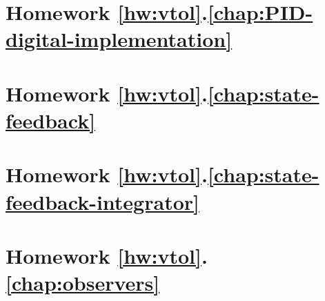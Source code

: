 	\section*{
		Homework \ref{hw:vtol}.\ref{chap:PID-digital-implementation}}  
		\label{hw:vtol_digital_PID}
		
	\section*{
		Homework \ref{hw:vtol}.\ref{chap:state-feedback}}  
		\label{hw:vtol_state_feedback}
		
	\section*{
		Homework \ref{hw:vtol}.\ref{chap:state-feedback-integrator}}  
		\label{hw:vtol_integrator_state_feedback}
		
	\section*{
		Homework \ref{hw:vtol}.\ref{chap:observers}}  
		\label{hw:vtol_observer}
		
